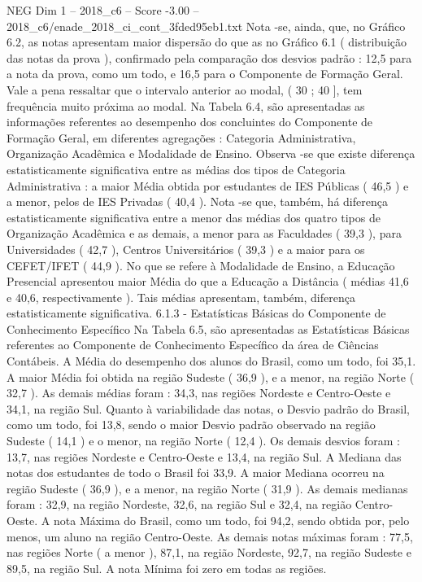 \begin{textsample}{NEG Dim 1 – 2018\_c6 – Score -3.00 – 2018\_c6/enade\_2018\_ci\_cont\_3fded95eb1.txt}
Nota -se, ainda, que, no Gráfico 6.2, as notas apresentam maior dispersão do que as no Gráfico 6.1 ( distribuição das notas da prova ), confirmado pela comparação dos desvios padrão : 12,5 para a nota da prova, como um todo, e 16,5 para o Componente de Formação Geral.
Vale a pena ressaltar que o intervalo anterior ao modal, ( 30 ; 40 ], tem frequência muito próxima ao modal.
Na Tabela 6.4, são apresentadas as informações referentes ao desempenho dos concluintes do Componente de Formação Geral, em diferentes agregações : Categoria Administrativa, Organização Acadêmica e Modalidade de Ensino.
Observa -se que existe diferença estatisticamente significativa entre as médias dos tipos de Categoria Administrativa : a maior Média obtida por estudantes de IES Públicas ( 46,5 ) e a menor, pelos de IES Privadas ( 40,4 ).
Nota -se que, também, há diferença estatisticamente significativa entre a menor das médias dos quatro tipos de Organização Acadêmica e as demais, a menor para as Faculdades ( 39,3 ), para Universidades ( 42,7 ), Centros Universitários ( 39,3 ) e a maior para os CEFET/IFET ( 44,9 ).
No que se refere à Modalidade de Ensino, a Educação Presencial apresentou maior Média do que a Educação a Distância ( médias 41,6 e 40,6, respectivamente ).
Tais médias apresentam, também, diferença estatisticamente significativa. 6.1.3 - Estatísticas Básicas do Componente de Conhecimento Específico Na Tabela 6.5, são apresentadas as Estatísticas Básicas referentes ao Componente de Conhecimento Específico da área de Ciências Contábeis.
A Média do desempenho dos alunos do Brasil, como um todo, foi 35,1.
A maior Média foi obtida na região Sudeste ( 36,9 ), e a menor, na região Norte ( 32,7 ).
As demais médias foram : 34,3, nas regiões Nordeste e Centro-Oeste e 34,1, na região Sul.
Quanto à variabilidade das notas, o Desvio padrão do Brasil, como um todo, foi 13,8, sendo o maior Desvio padrão observado na região Sudeste ( 14,1 ) e o menor, na região Norte ( 12,4 ).
Os demais desvios foram : 13,7, nas regiões Nordeste e Centro-Oeste e 13,4, na região Sul.
A Mediana das notas dos estudantes de todo o Brasil foi 33,9.
A maior Mediana ocorreu na região Sudeste ( 36,9 ), e a menor, na região Norte ( 31,9 ).
As demais medianas foram : 32,9, na região Nordeste, 32,6, na região Sul e 32,4, na região Centro-Oeste.
A nota Máxima do Brasil, como um todo, foi 94,2, sendo obtida por, pelo menos, um aluno na região Centro-Oeste.
As demais notas máximas foram : 77,5, nas regiões Norte ( a menor ), 87,1, na região Nordeste, 92,7, na região Sudeste e 89,5, na região Sul.
A nota Mínima foi zero em todas as regiões.

\end{textsample}
